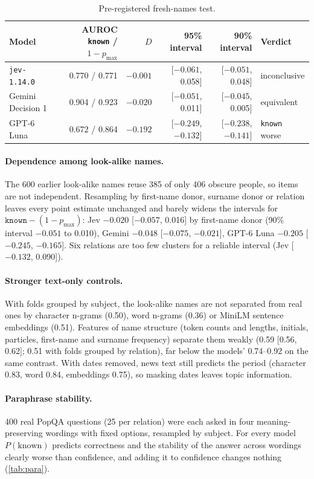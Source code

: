 \documentclass[10pt,twocolumn]{article}
\newcommand{\pmax}{p_{\max}}
\begin{document}
\begin{table}[h]
\centering\small
\caption{Pre-registered fresh-names test.}
\label{tab:freshnames}
\begin{tabular}{@{}l r r r r l@{}}
\toprule
Model & AUROC \texttt{known} / $1-\pmax$ & $D$ & 95\% interval & 90\% interval & Verdict \\
\midrule
\texttt{jev-1.14.0} & 0.770 / 0.771 & $-0.001$ & [$-0.061$, 0.058] & [$-0.051$, 0.048] & inconclusive \\
Gemini Decision 1 & 0.904 / 0.923 & $-0.020$ & [$-0.051$, 0.011] & [$-0.045$, 0.005] & equivalent \\
GPT-6 Luna & 0.672 / 0.864 & $-0.192$ & [$-0.249$, $-0.132$] & [$-0.238$, $-0.141$] & \texttt{known} worse \\
\bottomrule
\end{tabular}
\end{table}

\paragraph{Dependence among look-alike names.} The 600 earlier look-alike
names reuse 385 of only 406 obscure people, so items are not independent.
Resampling by first-name donor, surname donor or relation leaves every point
estimate unchanged and barely widens the intervals for
$\texttt{known}-(1-\pmax)$: Jev $-0.020$ [$-0.057$, 0.016] by first-name
donor (90\% interval $-0.051$ to 0.010), Gemini $-0.048$ [$-0.075$,
$-0.021$], GPT-6 Luna $-0.205$ [$-0.245$, $-0.165$]. Six relations are too
few clusters for a reliable interval (Jev [$-0.132$, 0.090]).

\paragraph{Stronger text-only controls.} With folds grouped by subject, the
look-alike names are not separated from real ones by character n-grams
(0.50), word n-grams (0.36) or MiniLM sentence embeddings (0.51). Features
of name structure (token counts and lengths, initials, particles, first-name
and surname frequency) separate them weakly (0.59 [0.56, 0.62]; 0.51 with
folds grouped by relation), far below the models' 0.74--0.92 on the same
contrast. With dates removed, news text still predicts the period (character
0.83, word 0.84, embeddings 0.75), so masking dates leaves topic information.

\paragraph{Paraphrase stability.} 400 real PopQA questions (25 per relation)
were each asked in four meaning-preserving wordings with fixed options,
resampled by subject. For every model $P(\text{known})$ predicts correctness
and the stability of the answer across wordings clearly worse than
confidence, and adding it to confidence changes nothing (\cref{tab:para}).
\end{document}
